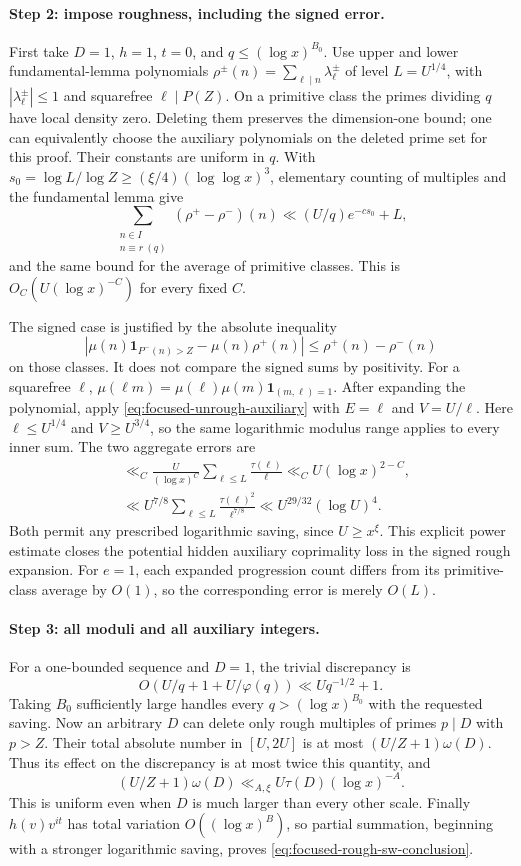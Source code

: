 \paragraph{Step 2: impose roughness, including the signed error.}
First take $D=1$, $h=1$, $t=0$, and $q\le(\log x)^{B_0}$.
Use upper and lower fundamental-lemma polynomials
$\rho^\pm(n)=\sum_{\ell\mid n}\lambda_\ell^\pm$ of level
$L=U^{1/4}$, with $|\lambda_\ell^\pm|\le1$ and squarefree
$\ell\mid P(Z)$. On a primitive class the primes dividing $q$ have
local density zero. Deleting them preserves the dimension-one bound;
one can equivalently choose the auxiliary polynomials on the deleted
prime set for this proof. Their constants are uniform in $q$.
With $s_0=\log L/\log Z\ge(\xi/4)(\log\log x)^3$, elementary
counting of multiples and the fundamental lemma give
\[
 \sum_{\substack{n\in I\\n\equiv r\ (q)}}(\rho^+-\rho^-)(n)
 \ll (U/q)e^{-c s_0}+L,
\]
and the same bound for the average of primitive classes. This is
$O_C(U(\log x)^{-C})$ for every fixed $C$.

The signed case is justified by the absolute inequality
\[
 |\mu(n)\mathbf1_{P^-(n)>Z}-\mu(n)\rho^+(n)|
 \le\rho^+(n)-\rho^-(n)
\]
on those classes. It does not compare the signed sums by positivity.
For a squarefree $\ell$,
$\mu(\ell m)=\mu(\ell)\mu(m)\mathbf1_{(m,\ell)=1}$.
After expanding the polynomial, apply
\eqref{eq:focused-unrough-auxiliary} with $E=\ell$ and $V=U/\ell$.
Here $\ell\le U^{1/4}$ and $V\ge U^{3/4}$, so the same logarithmic
modulus range applies to every inner sum. The two aggregate errors are
\begin{align*}
 &\ll_C \frac{U}{(\log x)^C}
          \sum_{\ell\le L}\frac{\tau(\ell)}\ell
       \ll_C U(\log x)^{2-C},\\
 &\ll U^{7/8}\sum_{\ell\le L}\frac{\tau(\ell)^2}{\ell^{7/8}}
       \ll U^{29/32}(\log U)^4.
\end{align*}
Both permit any prescribed logarithmic saving, since $U\ge x^\xi$.
This explicit power estimate closes the potential hidden auxiliary
coprimality loss in the signed rough expansion. For $e=1$, each
expanded progression count differs from its primitive-class average
by $O(1)$, so the corresponding error is merely $O(L)$.

\paragraph{Step 3: all moduli and all auxiliary integers.}
For a one-bounded sequence and $D=1$, the trivial discrepancy is
\[
 O(U/q+1+U/\varphi(q))\ll Uq^{-1/2}+1.
\]
Taking $B_0$ sufficiently large handles every
$q>(\log x)^{B_0}$ with the requested saving.
Now an arbitrary $D$ can delete only rough multiples of primes
$p\mid D$ with $p>Z$. Their total absolute number in $[U,2U]$ is
at most $(U/Z+1)\omega(D)$. Thus its effect on the discrepancy is at
most twice this quantity, and
\[
 (U/Z+1)\omega(D)\ll_{A,\xi}U\tau(D)(\log x)^{-A}.
\]
This is uniform even when $D$ is much larger than every other scale.
Finally $h(v)v^{it}$ has total variation
$O((\log x)^B)$, so partial summation, beginning with a stronger
logarithmic saving, proves \eqref{eq:focused-rough-sw-conclusion}.

